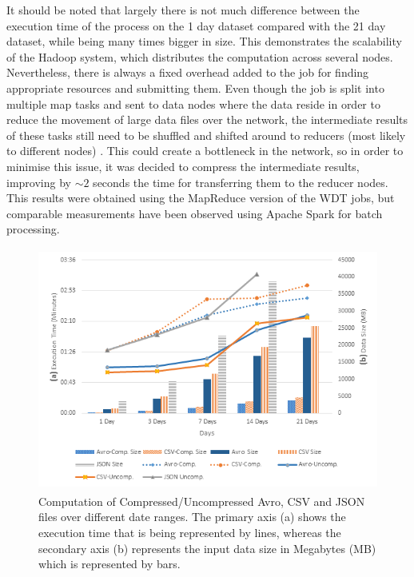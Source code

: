 It should be noted that largely there is not much difference between the execution time of the process on the 1 day dataset compared with the 21 day dataset, while being many times bigger in size. This demonstrates the scalability of the Hadoop system, which distributes the computation across several nodes. Nevertheless, there is always a fixed overhead added to the job for finding appropriate resources and submitting them. Even though the job is split into multiple map tasks and sent to data nodes where the data reside in order to reduce the movement of large data files over the network, the intermediate results of these tasks still need to be shuffled and shifted around to reducers (most likely to different nodes) \cite{mrgoogle}. This could create a bottleneck in the network, so in order to minimise this issue, it was decided to compress the intermediate results, improving by $\sim2$ seconds the time for transferring them to the reducer nodes. This results were obtained using the MapReduce version of the WDT jobs, but comparable measurements have been observed using Apache Spark for batch processing.

\begin{figure}
  \centering
  \includegraphics[width=140mm,height=80mm]{./Figures/mp_perf.png}
  \caption{\small Computation of Compressed/Uncompressed Avro, CSV and JSON files over different date ranges. The primary axis (a) shows the execution time that is being represented by lines, whereas the secondary axis (b) represents the input data size in Megabytes (MB) which is represented by bars.}\label{fig:mr}
\end{figure}

